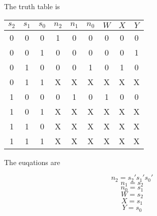 The truth table is 

\begin{center}
\begin{tabular}{ccc|cccccc}
$s_{2}$ & $s_{1}$ & $s_{0}$ & $n_{2}$ & $n_{1}$ & $n_{0}$ & $W$ & $X$ & $Y$ \\
\hline
0 & 0 & 0 & 1 & 0 & 0 & 0 & 0 & 0 \\
0 & 0 & 1 & 0 & 0 & 0 & 0 & 0 & 1 \\
0 & 1 & 0 & 0 & 0 & 1 & 0 & 1 & 0 \\
0 & 1 & 1 & X & X & X & X & X & X \\
1 & 0 & 0 & 0 & 1 & 0 & 1 & 0 & 0 \\
1 & 0 & 1 & X & X & X & X & X & X \\
1 & 1 & 0 & X & X & X & X & X & X \\
1 & 1 & 1 & X & X & X & X & X & X \\
\end{tabular}
\end{center}

The euqations are 

$$n_{2}=s_{2}'s_{1}'s_{0}'$$
$$n_{1}=s_{2}$$
$$n_{0}=s_{1}$$
$$W=s_{2}$$
$$X=s_{1}$$
$$Y=s_{0}$$


